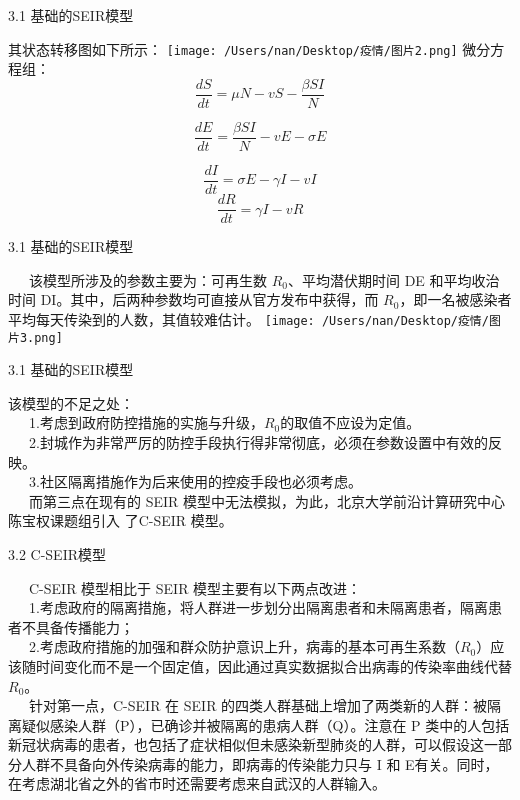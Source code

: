 \documentclass[
  ignorenonframetext,
]{beamer}
\begin{document}
\begin{frame}{3.1 基础的SEIR模型}
\protect\hypertarget{seir-2}{}

其状态转移图如下所示：
\texttt{[image: /Users/nan/Desktop/疫情/图片2.png]} 微分方程组：
\[ \frac {d S}{d t} = \mu N - v S - \frac {\beta S I}{N} \]

\[ \frac {d E}{d t} = \frac {\beta S I}{N} - v E - \sigma E \]

\[ \frac {d I}{d t} = \sigma E - \gamma I - v I \]
\[ \frac {d R}{d t} = \gamma I - v R \]

\end{frame}

\begin{frame}{3.1 基础的SEIR模型}
\protect\hypertarget{seir-3}{}

  该模型所涉及的参数主要为：可再生数 \(R_0\)、平均潜伏期时间 DE
和平均收治时间 DI。其中，后两种参数均可直接从官方发布中获得，而
\(R_0\)，即一名被感染者平均每天传染到的人数，其值较难估计。
\texttt{[image: /Users/nan/Desktop/疫情/图片3.png]}

\end{frame}

\begin{frame}{3.1 基础的SEIR模型}
\protect\hypertarget{seir-4}{}

该模型的不足之处：\\
  1.考虑到政府防控措施的实施与升级，\(R_0\)的取值不应设为定值。\\
  2.封城作为非常严厉的防控手段执行得非常彻底，必须在参数设置中有效的反映。\\
  3.社区隔离措施作为后来使用的控疫手段也必须考虑。\\
  而第三点在现有的 SEIR
模型中无法模拟，为此，北京大学前沿计算研究中心陈宝权课题组引入 了C-SEIR
模型。

\end{frame}

\begin{frame}{3.2 C-SEIR模型}
\protect\hypertarget{c-seir}{}

  C-SEIR 模型相比于 SEIR 模型主要有以下两点改进：\\
  1.考虑政府的隔离措施，将人群进一步划分出隔离患者和未隔离患者，隔离患者不具备传播能力；\\
  2.考虑政府措施的加强和群众防护意识上升，病毒的基本可再生系数（\(R_0\)）应该随时间变化而不是一个固定值，因此通过真实数据拟合出病毒的传染率曲线代替\(R_0\)。\\
  针对第一点，C-SEIR 在 SEIR
的四类人群基础上增加了两类新的人群：被隔离疑似感染人群（P），已确诊并被隔离的患病人群（Q）。注意在
P
类中的人包括新冠状病毒的患者，也包括了症状相似但未感染新型肺炎的人群，可以假设这一部分人群不具备向外传染病毒的能力，即病毒的传染能力只与
I 和 E有关。同时，在考虑湖北省之外的省市时还需要考虑来自武汉的人群输入。

\end{frame}
\end{document}
